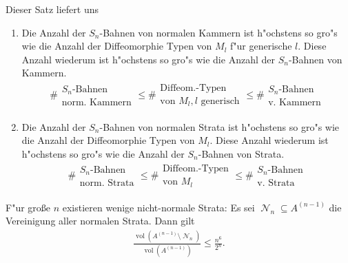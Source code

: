 \documentclass[paper=A4, twoside, chapterprefix=true, bibliography=totoc, headsepline]{scrbook}
\DeclareMathOperator{\calN}{{\mathcal{N}}}
\DeclareMathOperator{\vol}{vol} %
\theoremstyle{nonumberbreak}
\theoremstyle{emptybreak}
\theoremstyle{break}
\begin{document}
Dieser Satz liefert uns
\begin{enumerate}[label=\arabic*)]
\item
	Die Anzahl der $S_n$-Bahnen von normalen Kammern ist h"ochstens so gro"s wie die Anzahl der Diffeomorphie Typen von $M_l$ f"ur generische $l$.
	Diese Anzahl wiederum ist h"ochstens so gro"s wie die Anzahl der $S_n$-Bahnen von Kammern.
	\begin{align*}
		\# \begin{smallmatrix} S_n \text{-Bahnen} \\ \text{norm. Kammern} \end{smallmatrix}
		\le
		\# \begin{smallmatrix} \text{Diffeom.-Typen} \\ \text{von } M_l, l \text{ generisch} \end{smallmatrix}
		\le
		\# \begin{smallmatrix} S_n \text{-Bahnen} \\ \text{v. Kammern} \end{smallmatrix}
	\end{align*}
\item
	Die Anzahl der $S_n$-Bahnen von normalen Strata ist h"ochstens so gro"s wie die Anzahl der Diffeomorphie Typen von $M_l$.
	Diese Anzahl wiederum ist h"ochstens so gro"s wie die Anzahl der $S_n$-Bahnen von Strata.
	\begin{align*}
		\# \begin{smallmatrix} S_n \text{-Bahnen} \\ \text{norm. Strata} \end{smallmatrix}
		\le
		\# \begin{smallmatrix} \text{Diffeom.-Typen} \\ \text{von } M_l \end{smallmatrix}
		\le
		\# \begin{smallmatrix} S_n \text{-Bahnen} \\ \text{v. Strata} \end{smallmatrix}
	\end{align*}
\end{enumerate}

F"ur große $n$ existieren wenige nicht-normale Strata:
Es sei $\calN_n \subseteq A^{(n-1)}$ die Vereinigung aller normalen Strata.
Dann gilt
\begin{align*}
	\frac{\vol(A^{(n-1)} \setminus \calN_n)}{\vol(A^{(n-1)})} \le \frac{n^6}{2^n}.
\end{align*}

\end{document}
